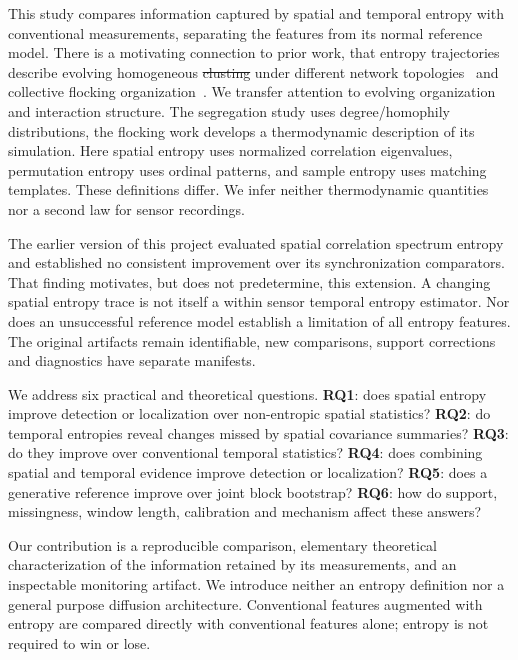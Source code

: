\documentclass{llncs}
\providecommand{\DIFaddtex}[1]{{\protect\color{blue}\uwave{#1}}} %
\providecommand{\DIFdeltex}[1]{{\protect\color{red}\sout{#1}}}                      %
\providecommand{\DIFaddbegin}{} %
\providecommand{\DIFaddend}{} %
\providecommand{\DIFdelbegin}{} %
\providecommand{\DIFdelend}{} %
\providecommand{\DIFadd}[1]{\texorpdfstring{\DIFaddtex{#1}}{#1}} %
\providecommand{\DIFdel}[1]{\texorpdfstring{\DIFdeltex{#1}}{}} %
\begin{document}
This study compares information captured by spatial and temporal entropy with
conventional measurements, separating the features from its normal reference
model. There is a motivating connection to prior work, that entropy
trajectories describe evolving homogeneous \DIFdelbegin \DIFdel{clusting }\DIFdelend \DIFaddbegin \DIFadd{clustering }\DIFaddend under different network
topologies~\cite{mantzaris2024} and collective flocking
organization~\cite{mantzaris2025}. We transfer attention to evolving organization
and interaction structure. The segregation study uses degree/homophily
distributions, the flocking work develops a thermodynamic description of its
simulation. Here spatial entropy uses normalized correlation eigenvalues,
permutation entropy uses ordinal patterns, and sample entropy uses matching
templates. These definitions differ. We infer neither thermodynamic quantities
nor a second law for sensor recordings.

The earlier version of this project evaluated spatial correlation spectrum
entropy and established no consistent improvement over its synchronization
comparators. That finding motivates, but does not predetermine, this extension.
A changing spatial entropy trace is not itself a within sensor temporal entropy
estimator. Nor does an unsuccessful reference model establish a limitation of
all entropy features. The original artifacts remain identifiable, new
comparisons, support corrections and diagnostics have separate manifests.

We address six practical and theoretical questions. \textbf{RQ1}: does spatial entropy improve detection
or localization over non-entropic spatial statistics? \textbf{RQ2}: do temporal
entropies reveal changes missed by spatial covariance summaries?
\textbf{RQ3}: do they improve over conventional temporal statistics?
\textbf{RQ4}: does combining spatial and temporal evidence improve detection
or localization? \textbf{RQ5}: does a generative reference improve over joint
block bootstrap? \textbf{RQ6}: how do support, missingness, window length,
calibration and mechanism affect these answers?

Our contribution is a reproducible comparison, elementary theoretical
characterization of the information retained by its measurements, and an
inspectable monitoring artifact. We introduce neither an entropy definition
nor a general purpose diffusion architecture. Conventional features augmented
with entropy are compared directly with conventional features alone; entropy
is not required to win or lose.
\end{document}

